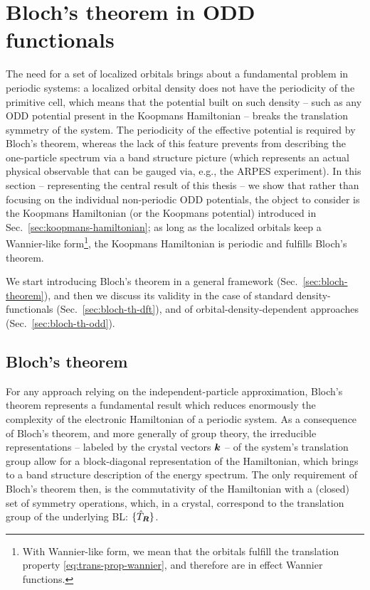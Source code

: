\section{Bloch's theorem in ODD functionals\label{sec:bloch-theorem-section}}
The need for a set of localized orbitals brings about a fundamental problem in periodic systems: a localized orbital density does not have the periodicity of the primitive cell, which means that the potential built on such density -- such as any ODD potential present in the Koopmans Hamiltonian -- breaks the translation symmetry of the system. The periodicity of the effective potential is required by Bloch's theorem, whereas the lack of this feature prevents from describing the one-particle spectrum via a band structure picture (which represents an actual physical observable that can be gauged via, e.g., the ARPES experiment). In this section -- representing the central result of this thesis -- we show that rather than focusing on the individual non-periodic ODD potentials, the object to consider is the Koopmans Hamiltonian (or the Koopmans potential) introduced in Sec.~\ref{sec:koopmans-hamiltonian}; as long as the localized orbitals keep a Wannier-like form\footnote{With Wannier-like form, we mean that the orbitals fulfill the translation property \eqref{eq:trans-prop-wannier}, and therefore are in effect Wannier functions.}, the Koopmans Hamiltonian is periodic and fulfills Bloch's theorem.

We start introducing Bloch's theorem in a general framework (Sec.~\ref{sec:bloch-theorem}), and then we discuss its validity in the case of standard density-functionals (Sec.~\ref{sec:bloch-th-dft}), and of orbital-density-dependent approaches (Sec.~\ref{sec:bloch-th-odd}).

\subsection{Bloch's theorem\label{sec:bloch-theorem}}
For any approach relying on the independent-particle approximation, Bloch's theorem represents a fundamental result which reduces enormously the complexity of the electronic Hamiltonian of a periodic system. As a consequence of Bloch’s theorem, and more generally of group theory, the irreducible representations -- labeled by the crystal vectors ${\bm k}$ -- of the system's translation group allow for a block-diagonal representation of the Hamiltonian, which brings to a band structure description of the energy spectrum. The only requirement of Bloch's theorem then, is the commutativity of the Hamiltonian with a (closed) set of symmetry operations, which, in a crystal, correspond to the translation group of the underlying BL: $\{ \hat{T}_{{\bm R}} \}$.

